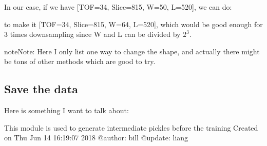 \documentclass[letterpaper,10pt,english]{sphinxmanual}
\begin{document}
In our case, if we have {[}TOF=34, Slice=815, W=50, L=520{]}, we can do:

%
\begin{sphinxVerbatim}[commandchars=\\\{\}]
           
\end{sphinxVerbatim}

to make it {[}TOF=34, Slice=815, W=64, L=520{]}, which would be good enough for 3 times downsampling since W and L can be divided by \(2^3\).

\begin{sphinxadmonition}{note}{Note:}
Here I only list one way to change the shape, and actually there might be tons of other methods which are good to try.
\end{sphinxadmonition}


\subsection{Save the data}
\label{\detokenize{usage/data:save-the-data}}
Here is something I want to talk about:

%
\begin{sphinxVerbatim}[commandchars=\\\{\}]
  

\end{sphinxVerbatim}
\label{\detokenize{usage/data:module-sino_process_tof}}
This module is used to generate intermediate pickles before the training
Created on Thu Jun 14 16:19:07 2018
@author: bill
@update: liang
\end{document}
